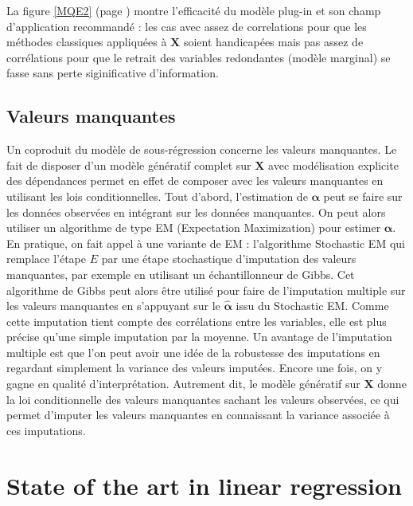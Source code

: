 \documentclass[12pt,a4paper]{report}
\begin{document}
	La figure \ref{MQE2} (page \pageref{MQE2}) montre l'efficacité du modèle plug-in et son champ d'application recommandé : les cas avec assez de correlations pour que les méthodes classiques appliquées à $\boldsymbol{X}$ soient handicapées mais pas assez de corrélations pour que le retrait des variables redondantes (modèle marginal)  se fasse sans perte siginificative d'information.
		
	\section{Valeurs manquantes}
		Un coproduit du modèle de sous-régression concerne les valeurs manquantes. Le fait de disposer d'un modèle génératif complet sur $\boldsymbol{X}$ avec modélisation explicite des dépendances permet en effet de composer avec les valeurs manquantes en utilisant les lois conditionnelles. Tout d'abord, l'estimation de $\boldsymbol{\alpha}$ peut se faire sur les données observées en intégrant sur les données manquantes. On peut alors utiliser un algorithme de type EM (Expectation Maximization) pour estimer $\hat{\boldsymbol{\alpha}}$.\\
		 
		 En pratique, on fait appel à une variante de EM : l'algorithme Stochastic EM qui remplace l'étape $E$ par une étape stochastique d'imputation des valeurs manquantes, par exemple en utilisant un échantillonneur de Gibbs. Cet algorithme de Gibbs peut alors être utilisé pour faire de l'imputation multiple sur les valeurs manquantes en s'appuyant sur le $\hat{\boldsymbol{\alpha}}$ issu du Stochastic EM. Comme cette imputation tient compte des corrélations entre les variables, elle est plus précise qu'une simple imputation par la moyenne. Un avantage de l'imputation multiple est que l'on peut avoir une idée de la robustesse des imputations en regardant simplement la variance des valeurs imputées. Encore une fois, on y gagne en qualité d'interprétation. 
		 Autrement dit, le modèle génératif sur $\boldsymbol{X}$ donne la loi conditionnelle des valeurs manquantes sachant les valeurs observées, ce qui permet d'imputer les valeurs manquantes en connaissant la variance associée à ces imputations.

\chapter{State of the art in linear regression}\label{stateart}
\end{document}
